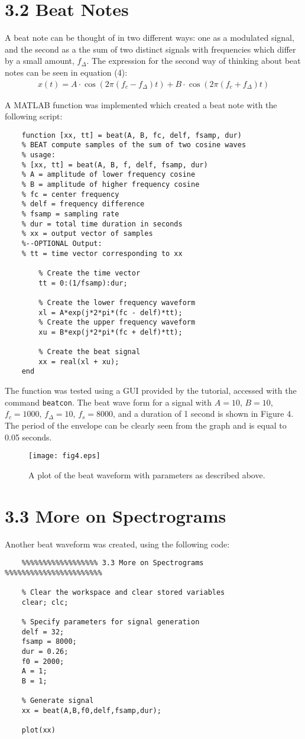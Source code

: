 \documentclass{article}
\begin{document}
\section{3.2 Beat Notes}
A beat note can be thought of in two different ways: one as a modulated signal, and the second as a the sum of two distinct signals with frequencies which differ by a small amount, $f_{\Delta}$. The expression for the second way of thinking about beat notes can be seen in equation (4):
\begin{align}
	x(t) = A \cdot \cos(2 \pi (f_c - f_{\Delta})t) + B \cdot \cos(2 \pi (f_c + f_{\Delta})t)
\end{align}

A MATLAB function was implemented which created a beat note with the following script:
\begin{lstlisting}
	function [xx, tt] = beat(A, B, fc, delf, fsamp, dur)
	% BEAT compute samples of the sum of two cosine waves
	% usage:
	% [xx, tt] = beat(A, B, f, delf, fsamp, dur)
	% A = amplitude of lower frequency cosine
	% B = amplitude of higher frequency cosine
	% fc = center frequency
	% delf = frequency difference
	% fsamp = sampling rate
	% dur = total time duration in seconds
	% xx = output vector of samples
	%--OPTIONAL Output:
	% tt = time vector corresponding to xx
	    
	    % Create the time vector
	    tt = 0:(1/fsamp):dur;
	    
	    % Create the lower frequency waveform
	    xl = A*exp(j*2*pi*(fc - delf)*tt);
	    % Create the upper frequency waveform
	    xu = B*exp(j*2*pi*(fc + delf)*tt);
	    
	    % Create the beat signal
	    xx = real(xl + xu);
	end
\end{lstlisting}

The function was tested using a GUI provided by the tutorial, accessed with the command \verb|beatcon|. The beat wave form for a signal with $A = 10$, $B = 10$, $f_c = 1000$, $f_{\Delta} = 10$, $f_s = 8000$, and a duration of 1 second is shown in Figure 4. The period of the envelope can be clearly seen from the graph and is equal to 0.05 seconds.

\begin{figure}
	\centering
	\texttt{[image: fig4.eps]}
	\caption{A plot of the beat waveform with parameters as described above.}
\end{figure}

\section{3.3 More on Spectrograms}
Another beat waveform was created, using the following code:
\begin{lstlisting}
	%%%%%%%%%%%%%%%%%% 3.3 More on Spectrograms %%%%%%%%%%%%%%%%%%%%%%%
	
	% Clear the workspace and clear stored variables
	clear; clc;
	
	% Specify parameters for signal generation
	delf = 32;
	fsamp = 8000;
	dur = 0.26;
	f0 = 2000;
	A = 1;
	B = 1;
	
	% Generate signal
	xx = beat(A,B,f0,delf,fsamp,dur);
	
	plot(xx)
\end{lstlisting}
\end{document}
